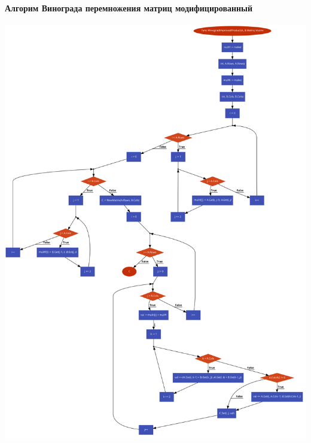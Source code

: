 \documentclass[utf8x, 12pt]{G7-32} %
\begin{document}
\paragraph{Алгорим Винограда перемножения матриц модифицированный}
\begin{center}
	\includegraphics[scale=0.3]{images/matrixWinogradImproved.png}
\end{center}

\newpage
\end{document}

